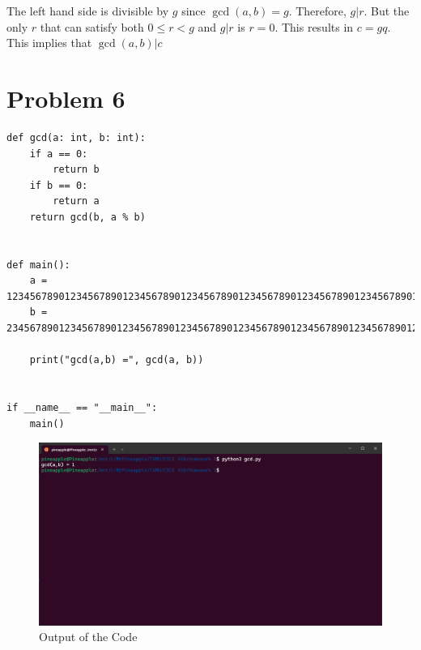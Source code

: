 \documentclass{article}
\begin{document}
\noindent
The left hand side is divisible by $g$ since $\gcd(a,b)=g$. Therefore, $g|r$. But the only $r$ that can satisfy both $0\leq r < g$ and $g|r$ is $r=0$. This results in $c=gq$. This implies that $\gcd(a,b)|c$

\newpage
\section*{Problem 6}
\begin{verbatim}
def gcd(a: int, b: int):
    if a == 0:
        return b
    if b == 0:
        return a
    return gcd(b, a % b)


def main():
    a = 1234567890123456789012345678901234567890123456789012345678901234567890123456789
    b = 234567890123456789012345678901234567890123456789012345678901234567890123456789

    print("gcd(a,b) =", gcd(a, b))


if __name__ == "__main__":
    main()
\end{verbatim}

\begin{figure}[ht!]
    \centering
    \includegraphics[width=\textwidth]{Problem 6.png}
    \caption{Output of the Code}
\end{figure}
\end{document}
